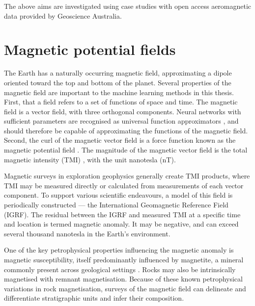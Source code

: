 The above aims are investigated using case studies with open access aeromagnetic data provided by Geoscience Australia.

\section{Magnetic potential fields}
The Earth has a naturally occurring magnetic field, approximating a dipole oriented toward the top and bottom of the planet.
Several properties of the magnetic field are important to the machine learning methods in this thesis.
First, that a field refers to a set of functions of space and time.
The magnetic field is a vector field, with three orthogonal components.
Neural networks with sufficient parameters are recognised as universal function approximators \parencite{hornikMultilayerFeedforwardNetworks1989}, and should therefore be capable of approximating the functions of the magnetic field.
Second, the curl of the magnetic vector field is a force function known as the magnetic potential field \parencite{kelloggFoundationsPotentialTheory1967}.
The magnitude of the magnetic vector field is the total magnetic intensity (TMI) \parencite{blakelyPotentialTheoryGravity1996}, with the unit nanotesla (nT).

Magnetic surveys in exploration geophysics generally create TMI products, where TMI may be measured directly or calculated from measurements of each vector component.
To support various scientific endeavours, a model of this field is periodically constructed --- the International Geomagnetic Reference Field (IGRF).
The residual between the IGRF and measured TMI at a specific time and location is termed magnetic anomaly.
It may be negative, and can exceed several thousand nanotesla in the Earth's environment.

One of the key petrophysical properties influencing the magnetic anomaly is magnetic susceptibility, itself predominantly influenced by magnetite, a mineral commonly present across geological settings \parencite{clarkNotesRockMagnetization1991}.
Rocks may also be intrinsically magnetised with remnant magnetisation.
Because of these known petrophysical variations in rock magnetisation, surveys of the magnetic field can delineate and differentiate stratigraphic units and infer their composition.

